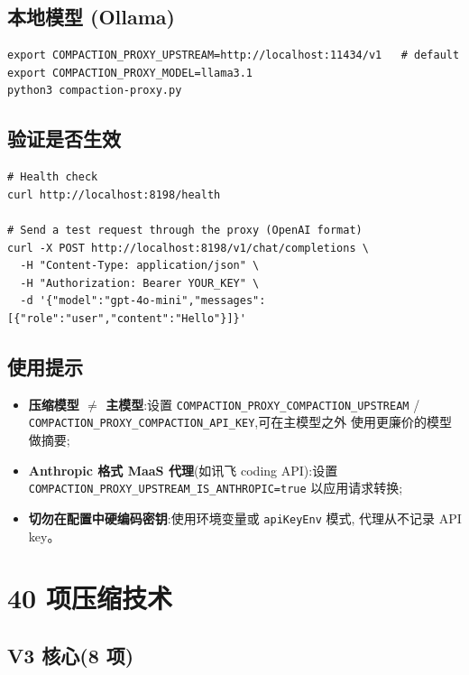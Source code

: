 \documentclass[11pt,a4paper]{article}
\begin{document}
\subsection{本地模型 (Ollama)}

\begin{lstlisting}
export COMPACTION_PROXY_UPSTREAM=http://localhost:11434/v1   # default
export COMPACTION_PROXY_MODEL=llama3.1
python3 compaction-proxy.py
\end{lstlisting}

\subsection{验证是否生效}

\begin{lstlisting}
# Health check
curl http://localhost:8198/health

# Send a test request through the proxy (OpenAI format)
curl -X POST http://localhost:8198/v1/chat/completions \
  -H "Content-Type: application/json" \
  -H "Authorization: Bearer YOUR_KEY" \
  -d '{"model":"gpt-4o-mini","messages":[{"role":"user","content":"Hello"}]}'
\end{lstlisting}

\subsection{使用提示}

\begin{itemize}
  \item \textbf{压缩模型 $\neq$ 主模型}:设置
        \texttt{COMPACTION\_PROXY\_COMPACTION\_UPSTREAM} /
        \texttt{COMPACTION\_PROXY\_COMPACTION\_API\_KEY},可在主模型之外
        使用更廉价的模型做摘要;
  \item \textbf{Anthropic 格式 MaaS 代理}(如讯飞 coding API):设置
        \texttt{COMPACTION\_PROXY\_UPSTREAM\_IS\_ANTHROPIC=true} 以应用请求转换;
  \item \textbf{切勿在配置中硬编码密钥}:使用环境变量或 \texttt{apiKeyEnv} 模式,
        代理从不记录 API key。
\end{itemize}

\section{40 项压缩技术}

\subsection{V3 核心(8 项)}
\end{document}
